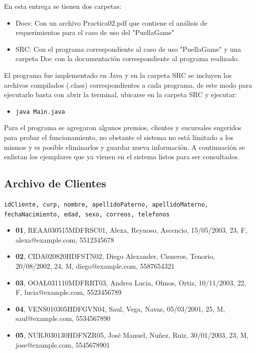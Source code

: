 \documentclass{article}
\begin{document}
En esta entrega se tienen dos carpetas:
\begin{itemize}
    \item Docs: Con un archivo Practica02.pdf que contiene el análisis de requerimientos para el caso de uso del "PuellaGame"
    \item SRC: Con el programa correspondiente al caso de uso "PuellaGame" y una carpeta Doc con la documentación correspondiente al programa realizado.
\end{itemize}
El programa fue implementado en Java y en la carpeta SRC se incluyen los archivos compilados (.class) correspondientes a cada programa, de este modo para ejecutarlo basta con abrir la terminal, ubicarse en la carpeta SRC y ejecutar:
\begin{itemize}
    \item \texttt{java Main.java}
\end{itemize}
Para el programa se agregaron algunos premios, clientes y sucursales sugeridos para probar el funcionamiento, no obstante el sistema no está limitado a los mismos y es posible eliminarlos y guardar nueva información. A continuación se enlistan los ejemplares que ya vienen en el sistema listos para ser consultados.\\

\subsection*{Archivo de Clientes}
\texttt{idCliente, curp, nombre, apellidoPaterno, apellidoMaterno, fechaNacimiento, edad, sexo, correos, telefonos}
\begin{itemize}
    \item \textbf{01}, REAA030515MDFRSC01, Alexa, Reynoso, Ascencio, 15/05/2003, 23, F, alexa@example.com, 5512345678
    \item \textbf{02}, CIDA020820HDFSTN02, Diego Alexander, Cisneros, Tenorio, 20/08/2002, 24, M, diego@example.com, 5587654321
    \item \textbf{03}, OOAL031110MDFRRT03, Andrea Lucia, Olmos, Ortiz, 10/11/2003, 22, F, lucia@example.com, 5523456789
    \item \textbf{04}, VENS010305HDFGVN04, Saul, Vega, Navas, 05/03/2001, 25, M, saul@example.com, 5534567890
    \item \textbf{05}, NURJ030130HDFNZR05, José Manuel, Nuñez, Ruiz, 30/01/2003, 23, M, jose@example.com, 5545678901
\end{itemize}
\end{document}
